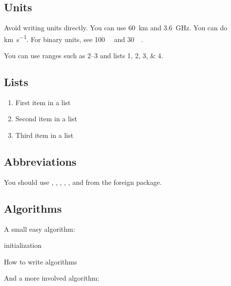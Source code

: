 \subsection{Units}
Avoid writing units directly.
You can use \SI{60}{\km} and \SI{3.6}{\giga\Hz}.
You can do \si{\km\per\second}.
For binary units, see \SI{100}{\mebi\byte} and \SI[prefixes-as-symbols=false]{30}{\kibi\bit}.

You can use ranges such as \numrange{2}{3} and lists \numlist{1;2;3;4}.


\subsection{Lists}

\lipsum[5] %

\begin{enumerate}[noitemsep] %
\item First item in a list
\item Second item in a list
\item Third item in a list
\end{enumerate}

\subsection{Abbreviations}
You should use \eg, \etc, \adhoc, \circa, \ala, and \apriori from the foreign package.

\subsection{Algorithms}
A small easy algorithm:

\begin{algorithm}[H]
\SetAlgoLined
{}

initialization\; 
\caption{How to write algorithms}
\end{algorithm}

And a more involved algorithm:




